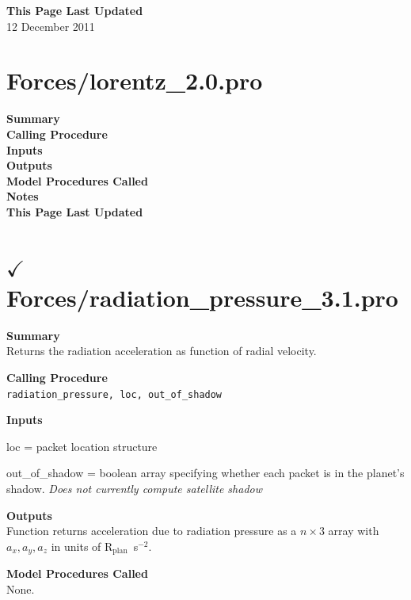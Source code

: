 \documentclass[11pt]{article}
\newcommand\descrip[1]{\textsf{\textbf{\large{#1}}}\\}
\newcommand\Rplan{R$_{\mathrm{plan}}$}
\begin{document}
\descrip{This Page Last Updated}
12 December 2011

\clearpage

\section{Forces/lorentz\_2.0.pro} \label{sec:lorentz}

\descrip{Summary}

\descrip{Calling Procedure}

\descrip{Inputs}

\descrip{Outputs}

\descrip{Model Procedures Called}

\descrip{Notes}

\descrip{This Page Last Updated}

\clearpage

\section{$\checkmark$Forces/radiation\_pressure\_3.1.pro} \label{sec:radiation_pressure}

\descrip{Summary}
Returns the radiation acceleration as function of radial velocity.

\descrip{Calling Procedure}
\verb+radiation_pressure, loc, out_of_shadow+

\descrip{Inputs}
\begin{compactenum} \listup
\item loc = packet location structure
\item out\_of\_shadow = boolean array specifying whether each packet is in the
planet's shadow. \textit{Does not currently compute satellite shadow}
\end{compactenum}

\descrip{Outputs}
Function returns acceleration due to radiation pressure as a $n\times3$ array 
with $a_x, a_y, a_z$ in units of \Rplan\ s$^{-2}$.

\descrip{Model Procedures Called}
None.
\end{document}
